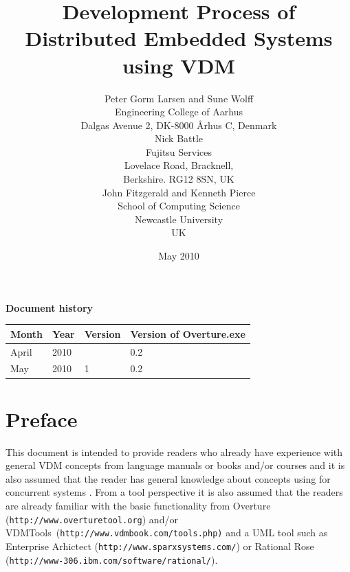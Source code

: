 \documentclass{overturerepchap}
\newcommand{\VDMTools}{VDMTools}
\newcommand{\url}[1]{\texttt{#1}}
\begin{document}
\title{Development Process of Distributed Embedded Systems using VDM}
\author{Peter Gorm Larsen and Sune Wolff \\ 
Engineering College of Aarhus\\
Dalgas Avenue 2, DK-8000 \AA{}rhus C, Denmark\\[3mm]
Nick Battle\\
Fujitsu Services\\
Lovelace Road, Bracknell, \\
Berkshire. RG12 8SN, UK\\[3mm]
John Fitzgerald and Kenneth Pierce\\
School of Computing Science\\
Newcastle University\\
UK
}
\date{May 2010}


\maketitle


{\textbf{Document history}}

\begin{tabular}{|l|l|l|l|}\hline
Month   & Year & Version & Version of Overture.exe \\ \hline
April   & 2010 &   & 0.2   \\ \hline
May     & 2010 & 1 & 0.2 \\ \hline
\end{tabular}

\tableofcontents

\chapter*{Preface}

This document is intended to provide readers who already have
experience with general VDM concepts from language manuals
\cite{LangManPP} or books \cite{Fitzgerald&05} and/or courses and it
is also assumed that the reader has general knowledge about concepts
using for concurrent systems
\cite{Ben-Ari82,Hoare85,Chandy&88,Milner89,Lea99}. From a tool perspective
it is also assumed that the readers are already familiar with the
basic functionality from Overture (\url{http://www.overturetool.org}) 
and/or \VDMTools\
(\url{http://www.vdmbook.com/tools.php)} and a UML tool such as
Enterprise Arhictect (\url{http://www.sparxsystems.com/})
or Rational Rose (\url{http://www-306.ibm.com/software/rational/}).
\end{document}
